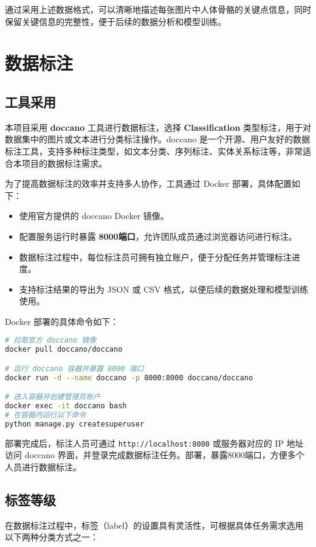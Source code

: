 通过采用上述数据格式，可以清晰地描述每张图片中人体骨骼的关键点信息，同时保留关键信息的完整性，便于后续的数据分析和模型训练。

\section{数据标注}

\subsection{工具采用}

本项目采用 \textbf{doccano} 工具进行数据标注，选择 \textbf{Classification} 类型标注，用于对数据集中的图片或文本进行分类标注操作。doccano 是一个开源、用户友好的数据标注工具，支持多种标注类型，如文本分类、序列标注、实体关系标注等，非常适合本项目的数据标注需求。

为了提高数据标注的效率并支持多人协作，工具通过 Docker 部署，具体配置如下：
\begin{itemize}
    \item 使用官方提供的 doccano Docker 镜像。
    \item 配置服务运行时暴露 \textbf{8000端口}，允许团队成员通过浏览器访问进行标注。
    \item 数据标注过程中，每位标注员可拥有独立账户，便于分配任务并管理标注进度。
    \item 支持标注结果的导出为 JSON 或 CSV 格式，以便后续的数据处理和模型训练使用。
\end{itemize}

Docker 部署的具体命令如下：
\begin{lstlisting}[language=bash]
# 拉取官方 doccano 镜像
docker pull doccano/doccano

# 运行 doccano 容器并暴露 8000 端口
docker run -d --name doccano -p 8000:8000 doccano/doccano

# 进入容器并创建管理员账户
docker exec -it doccano bash
# 在容器内运行以下命令
python manage.py createsuperuser
\end{lstlisting}

部署完成后，标注人员可通过 \texttt{http://localhost:8000} 或服务器对应的 IP 地址访问 doccano 界面，并登录完成数据标注任务。部署，暴露8000端口，方便多个人员进行数据标注。

\subsection{标签等级}

在数据标注过程中，标签（label）的设置具有灵活性，可根据具体任务需求选用以下两种分类方式之一：

